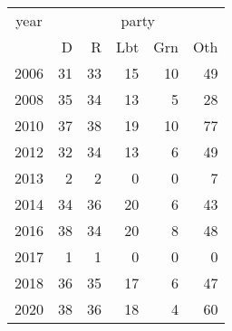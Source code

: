 \footnotesize\begin{tabular}[t]{lrrrrr}
\toprule
\multicolumn{1}{c}{year} & \multicolumn{5}{c}{party} \\
\cmidrule(l{3pt}r{3pt}){1-1} \cmidrule(l{3pt}r{3pt}){2-6}
  & D & R & Lbt & Grn & Oth\\
\midrule
2006 & 31 & 33 & 15 & 10 & 49\\
2008 & 35 & 34 & 13 & 5 & 28\\
2010 & 37 & 38 & 19 & 10 & 77\\
2012 & 32 & 34 & 13 & 6 & 49\\
2013 & 2 & 2 & 0 & 0 & 7\\
2014 & 34 & 36 & 20 & 6 & 43\\
2016 & 38 & 34 & 20 & 8 & 48\\
2017 & 1 & 1 & 0 & 0 & 0\\
2018 & 36 & 35 & 17 & 6 & 47\\
2020 & 38 & 36 & 18 & 4 & 60\\
\bottomrule
\end{tabular}
